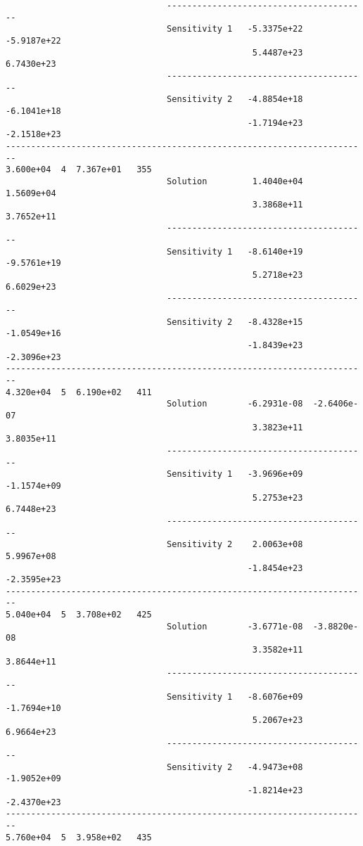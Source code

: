 \begin{verbatim}
                                ----------------------------------------
                                Sensitivity 1   -5.3375e+22  -5.9187e+22 
                                                 5.4487e+23   6.7430e+23 
                                ----------------------------------------
                                Sensitivity 2   -4.8854e+18  -6.1041e+18 
                                                -1.7194e+23  -2.1518e+23 
------------------------------------------------------------------------
3.600e+04  4  7.367e+01   355
                                Solution         1.4040e+04   1.5609e+04 
                                                 3.3868e+11   3.7652e+11 
                                ----------------------------------------
                                Sensitivity 1   -8.6140e+19  -9.5761e+19 
                                                 5.2718e+23   6.6029e+23 
                                ----------------------------------------
                                Sensitivity 2   -8.4328e+15  -1.0549e+16 
                                                -1.8439e+23  -2.3096e+23 
------------------------------------------------------------------------
4.320e+04  5  6.190e+02   411
                                Solution        -6.2931e-08  -2.6406e-07 
                                                 3.3823e+11   3.8035e+11 
                                ----------------------------------------
                                Sensitivity 1   -3.9696e+09  -1.1574e+09 
                                                 5.2753e+23   6.7448e+23 
                                ----------------------------------------
                                Sensitivity 2    2.0063e+08   5.9967e+08 
                                                -1.8454e+23  -2.3595e+23 
------------------------------------------------------------------------
5.040e+04  5  3.708e+02   425
                                Solution        -3.6771e-08  -3.8820e-08 
                                                 3.3582e+11   3.8644e+11 
                                ----------------------------------------
                                Sensitivity 1   -8.6076e+09  -1.7694e+10 
                                                 5.2067e+23   6.9664e+23 
                                ----------------------------------------
                                Sensitivity 2   -4.9473e+08  -1.9052e+09 
                                                -1.8214e+23  -2.4370e+23 
------------------------------------------------------------------------
5.760e+04  5  3.958e+02   435

\end{verbatim}

